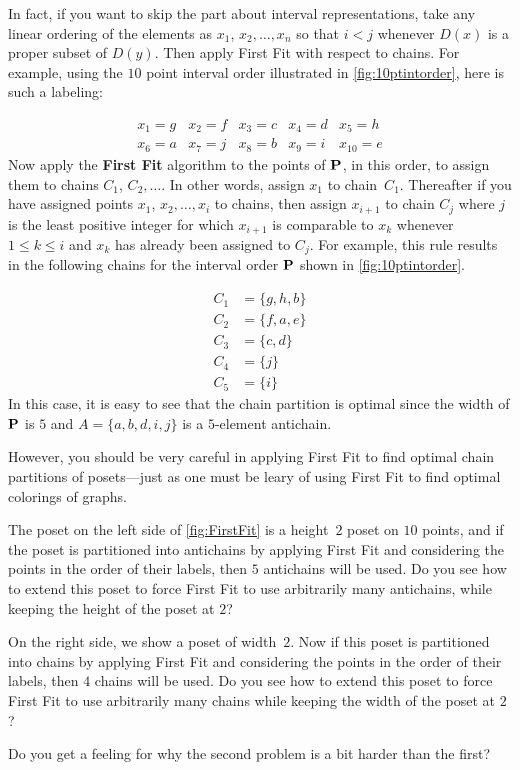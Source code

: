 In fact, if you want to skip the part about interval representations,
take any linear ordering of the elements as $x_1$, $x_2,\dots,x_n$ so that
$i<j$ whenever $D(x)$ is a proper subset of $D(y)$.  Then apply First
Fit with respect to chains.  For example, using
the $10$ point interval order illustrated in \autoref{fig:10ptintorder},
here is such a labeling: 

\[\begin{array}{ccccc}
x_1 =g &
x_2 =f &
x_3 =c &
x_4 =d &
x_5 =h\\
x_6 =a &
x_7 =j &
x_8 =b &
x_9 =i &
x_{10} =e
\end{array}\]
Now apply the \textbf{First Fit} algorithm to the points of $\mathbf{P}$,
in this order, to assign them to chains $C_1$, $C_2,\dots$.  In other
words, assign $x_1$ to chain~$C_1$.  Thereafter if you have
assigned points $x_1$, $x_2,\dots,x_i$ to chains, then assign
$x_{i+1}$ to chain $C_j$ where $j$ is the least positive integer
for which $x_{i+1}$ is comparable to $x_k$ whenever $1\le k\le i$ and
$x_k$ has already been assigned to $C_j$.
For example, this rule results in the following chains for the
interval order $\mathbf{P}$ shown in \autoref{fig:10ptintorder}.

\begin{align*}
C_1 &= \{g,h,b\}\\ 
C_2 &= \{f,a,e\}\\
C_3 &= \{c,d\}\\
C_4 &= \{j\}\\
C_5 &= \{i\}
\end{align*}
In this case, it is easy to see that the chain partition is
optimal since the width of $\mathbf{P}$ is $5$ and $A=\{a,b,d,i,j\}$
is a $5$-element antichain.

However, you should be very careful in applying First Fit to find
optimal chain partitions of posets---just as one must be leary of
using First Fit to find optimal colorings of graphs.

\begin{example}
  The poset on the left side of \autoref{fig:FirstFit} is a height~$2$
  poset on $10$ points, and if the poset is partitioned into
  antichains by applying First Fit and considering the points in the
  order of their labels, then $5$ antichains will be used.  Do you see
  how to extend this poset to force First Fit to use arbitrarily many
  antichains, while keeping the height of the poset at $2$?

  On the right side, we show a poset of width~$2$.  Now if this poset
  is partitioned into chains by applying First Fit and considering the
  points in the order of their labels, then $4$ chains will be used.
  Do you see how to extend this poset to force First Fit to use
  arbitrarily many chains while keeping the width of the poset at $2$?

  Do you get a feeling for why the second problem is a bit harder than
  the first?
\end{example}

